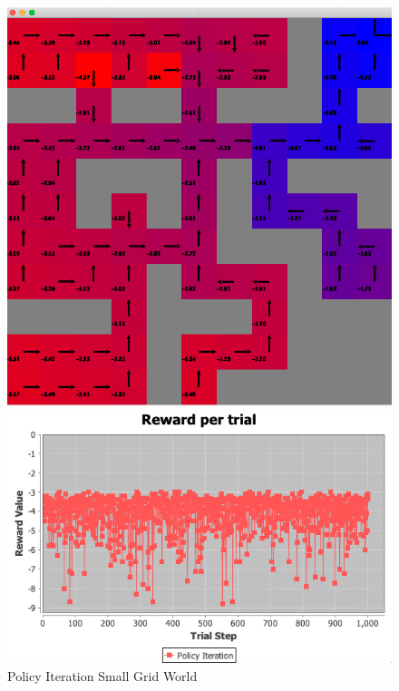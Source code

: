 \documentclass[11pt]{article}
\newcommand{\problemone}{Small Grid World}
\begin{document}
    \begin{figure}
        \begin{minipage}{0.5\textwidth}
            \centering
            \includegraphics[width=1\linewidth]{smallgridworld.png}
            \caption{Small Grid World}\label{Fig:Small Grid World}
        \end{minipage}
        \begin{minipage}{0.5\textwidth}
            \centering
            \includegraphics[width=0.99\linewidth]{policyiterationreward.png}
            \caption{Policy Iteration \problemone}\label{Fig:Policy Iteration \problemone}
        \end{minipage}
    \end{figure}
\end{document}
